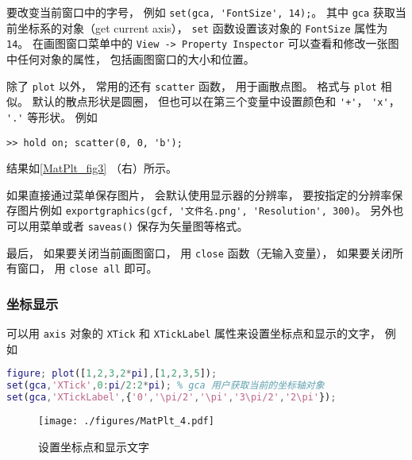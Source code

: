 要改变当前窗口中的字号， 例如 \verb|set(gca, 'FontSize', 14);|。 其中 \verb|gca| 获取当前坐标系的对象（get current axis）， \verb|set| 函数设置该对象的 \verb|FontSize| 属性为 \verb|14|。 在画图窗口菜单中的 \verb|View -> Property Inspector| 可以查看和修改一张图中任何对象的属性， 包括画图窗口的大小和位置。

除了 \verb|plot| 以外， 常用的还有 \verb|scatter| 函数， 用于画散点图。 格式与 \verb|plot| 相似。 默认的散点形状是圆圈， 但也可以在第三个变量中设置颜色和 \verb|'+'|， \verb|'x'|， \verb|'.'| 等形状。 例如
\begin{lstlisting}[language=matlabC]
>> hold on; scatter(0, 0, 'b');
\end{lstlisting}
结果如\autoref{MatPlt_fig3} （右）所示。

如果直接通过菜单保存图片， 会默认使用显示器的分辨率， 要按指定的分辨率保存图片例如 \verb|exportgraphics(gcf, '文件名.png', 'Resolution', 300)|。 另外也可以用菜单或者 \verb|saveas()| 保存为矢量图等格式。

最后， 如果要关闭当前画图窗口， 用 \verb|close| 函数（无输入变量）， 如果要关闭所有窗口， 用 \verb|close all| 即可。

\subsubsection{坐标显示}
可以用 \verb|axis| 对象的 \verb|XTick| 和 \verb|XTickLabel| 属性来设置坐标点和显示的文字， 例如 
\begin{lstlisting}[language=matlab]
figure; plot([1,2,3,2*pi],[1,2,3,5]);
set(gca,'XTick',0:pi/2:2*pi); % gca 用户获取当前的坐标轴对象
set(gca,'XTickLabel',{'0','\pi/2','\pi','3\pi/2','2\pi'});
\end{lstlisting}
\begin{figure}[ht]
\centering
\texttt{[image: ./figures/MatPlt\_4.pdf]}
\caption{设置坐标点和显示文字} \label{MatPlt_fig4}
\end{figure}
